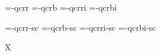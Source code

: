 

\ifx\sizespec\undefined \def\sizespec{}\fi
\ifx\font\corkencoded {}\else {}\fi

\font\tenrm=\tmp-qcrr  \sizespec
\font\tenbf=\tmp-qcrb  \sizespec
\font\tenit=\tmp-qcrri \sizespec
\font\tenbi=\tmp-qcrbi \sizespec

\font\tenrmc=\tmp-qcrr-sc  \sizespec
\font\tenbfc=\tmp-qcrb-sc  \sizespec
\font\tenitc=\tmp-qcrri-sc \sizespec
\font\tenbic=\tmp-qcrbi-sc \sizespec

\tenrm

\def\caps#1{{\escapechar=-1 \expandafter}%
  \expandafter\csname\expandafter\tenonlytext\string#1c\endcsname}
\def\tenonlytext{ten}

\ifx\font\corkencoded\else \ifx\font\unicoded\else  \fi\fi
\ifx\mathpreloaded X\else  \fi                     


